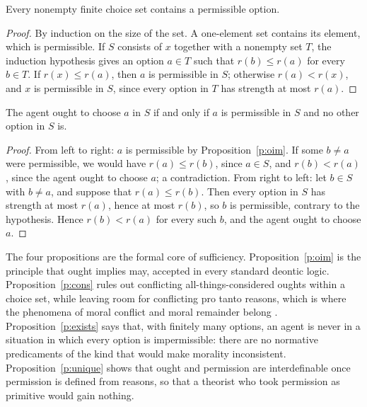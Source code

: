 \documentclass{situationist-preprint}
\begin{document}
\begin{proposition}[No predicaments]\label{p:exists}
Every nonempty finite choice set contains a permissible option.
\end{proposition}

\begin{proof}
By induction on the size of the set. A one-element set contains its element, which is permissible. If $S$ consists of $x$ together with a nonempty set $T$, the induction hypothesis gives an option $a\in T$ such that $r(b)\le r(a)$ for every $b\in T$. If $r(x)\le r(a)$, then $a$ is permissible in $S$; otherwise $r(a)<r(x)$, and $x$ is permissible in $S$, since every option in $T$ has strength at most $r(a)$.
\end{proof}

\begin{proposition}\label{p:unique}
The agent ought to choose $a$ in $S$ if and only if $a$ is permissible in $S$ and no other option in $S$ is.
\end{proposition}

\begin{proof}
From left to right: $a$ is permissible by Proposition~\ref{p:oim}. If some $b\neq a$ were permissible, we would have $r(a)\le r(b)$, since $a\in S$, and $r(b)<r(a)$, since the agent ought to choose $a$; a contradiction. From right to left: let $b\in S$ with $b\neq a$, and suppose that $r(a)\le r(b)$. Then every option in $S$ has strength at most $r(a)$, hence at most $r(b)$, so $b$ is permissible, contrary to the hypothesis. Hence $r(b)<r(a)$ for every such $b$, and the agent ought to choose $a$.
\end{proof}

The four propositions are the formal core of sufficiency. Proposition~\ref{p:oim} is the principle that ought implies may, accepted in every standard deontic logic. Proposition~\ref{p:cons} rules out conflicting all-things-considered oughts within a choice set, while leaving room for conflicting pro tanto reasons, which is where the phenomena of moral conflict and moral remainder belong \citep{Williams1965}. Proposition~\ref{p:exists} says that, with finitely many options, an agent is never in a situation in which every option is impermissible: there are no normative predicaments of the kind that would make morality inconsistent. Proposition~\ref{p:unique} shows that ought and permission are interdefinable once permission is defined from reasons, so that a theorist who took permission as primitive would gain nothing.
\end{document}
